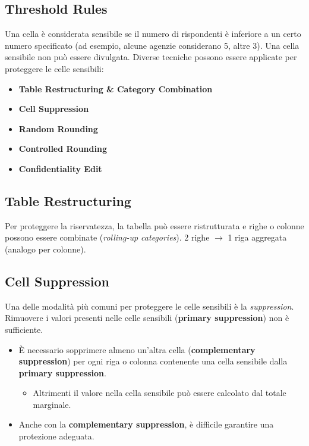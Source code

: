 \documentclass{report}
\begin{document}
\subsection{Threshold Rules}
Una cella è considerata sensibile se il numero di rispondenti è inferiore a un certo numero specificato (ad esempio, alcune agenzie considerano 5, altre 3). 
Una cella sensibile non può essere divulgata.
Diverse tecniche possono essere applicate per proteggere le celle sensibili:
\begin{itemize}
    \item \textbf{Table Restructuring \& Category Combination}
    \item \textbf{Cell Suppression}
    \item \textbf{Random Rounding}
    \item \textbf{Controlled Rounding}
    \item \textbf{Confidentiality Edit}
\end{itemize}

\subsection{Table Restructuring}
Per proteggere la riservatezza, la tabella può essere ristrutturata e righe o colonne possono essere combinate (\textit{rolling-up categories}). 2 righe $\rightarrow$ 1 riga aggregata (analogo per colonne).

\subsection{Cell Suppression}
Una delle modalità più comuni per proteggere le celle sensibili è la \textit{suppression}.\\
Rimuovere i valori presenti nelle celle sensibili (\textbf{primary suppression}) non è sufficiente. 
\begin{itemize}
    \item È necessario sopprimere almeno un'altra cella (\textbf{complementary suppression}) per ogni riga o colonna contenente una cella sensibile dalla \textbf{primary suppression}. 
    \begin{itemize}
        \item Altrimenti il valore nella cella sensibile può essere calcolato dal totale marginale.
    \end{itemize}
    \item Anche con la \textbf{complementary suppression}, è difficile garantire una protezione adeguata.
\end{itemize}
\end{document}
